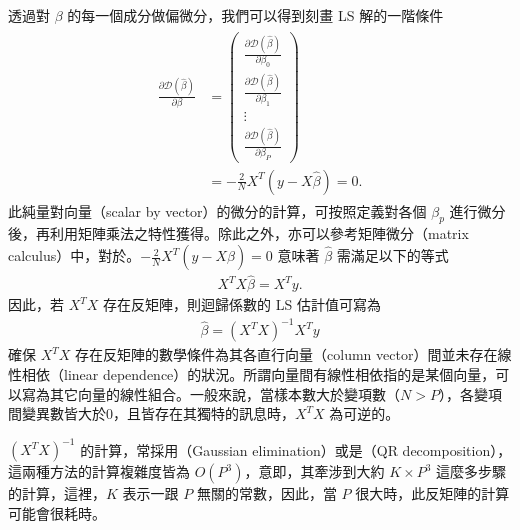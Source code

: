 \documentclass[letterpaper,10pt,english]{sphinxmanual}
\begin{document}
透過對 \(\beta\) 的每一個成分做偏微分，我們可以得到刻畫 LS 解的一階條件
\begin{equation*}
\begin{split}\begin{aligned}
\frac{\partial \mathcal{D}(\widehat{\beta})}{\partial \beta}&=
\begin{pmatrix}
  \frac{\partial \mathcal{D}(\widehat{\beta})}{\partial \beta_0}  \\
  \frac{\partial \mathcal{D}(\widehat{\beta})}{\partial \beta_1} \\
   \vdots \\
  \frac{\partial \mathcal{D}(\widehat{\beta})}{\partial \beta_P}
 \end{pmatrix} \\
&=-\frac{2}{N} X^T(y-X\widehat{\beta})=0.
\end{aligned}\end{split}
\end{equation*}
此純量對向量（scalar by vector）的微分的計算，可按照定義對各個 \(\beta_p\) 進行微分後，再利用矩陣乘法之特性獲得。除此之外，亦可以參考矩陣微分（matrix calculus）中，對於。\(-\frac{2}{N} X^T(y-X\widehat{\beta})=0\) 意味著 \(\widehat{\beta}\) 需滿足以下的等式
\begin{equation*}
\begin{split}
X^T X\widehat{\beta}=X^Ty.
\end{split}
\end{equation*}
因此，若 \(X^T X\) 存在反矩陣，則迴歸係數的 LS 估計值可寫為
\begin{equation*}
\begin{split}
\widehat{\beta} = (X^T X)^{-1} X^Ty
\end{split}
\end{equation*}
確保 \(X^T X\) 存在反矩陣的數學條件為其各直行向量（column vector）間並未存在線性相依（linear dependence）的狀況。所謂向量間有線性相依指的是某個向量，可以寫為其它向量的線性組合。一般來說，當樣本數大於變項數（\(N > P\)），各變項間變異數皆大於0，且皆存在其獨特的訊息時，\(X^T X\) 為可逆的。

\((X^T X)^{-1}\) 的計算，常採用（Gaussian elimination）或是（QR decomposition），這兩種方法的計算複雜度皆為 \(O(P^3)\)，意即，其牽涉到大約 \(K \times P^3\) 這麼多步驟的計算，這裡，\(K\) 表示一跟 \(P\) 無關的常數，因此，當 \(P\) 很大時，此反矩陣的計算可能會很耗時。
\end{document}
